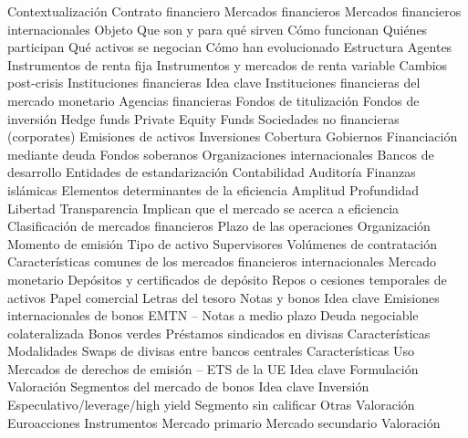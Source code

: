 \documentclass{nuevotema}
\begin{document}
\begin{esquema}[enumerate]
	\1[] 
		\2 Contextualización
			\3 Contrato financiero
			\3 Mercados financieros
			\3 Mercados financieros internacionales
		\2 Objeto
			\3 Que son y para qué sirven
			\3 Cómo funcionan
			\3 Quiénes participan
			\3 Qué activos se negocian
			\3 Cómo han evolucionado
		\2 Estructura
			\3 Agentes
			\3 Instrumentos de renta fija
			\3 Instrumentos y mercados de renta variable
			\3 Cambios post-crisis
	\1 
		\2 Instituciones financieras
			\3 Idea clave
			\3 Instituciones financieras del mercado monetario
			\3 Agencias financieras
			\3 Fondos de titulización
			\3 Fondos de inversión
			\3 Hedge funds
			\3 Private Equity Funds
		\2 Sociedades no financieras (corporates)
			\3 Emisiones de activos
			\3 Inversiones
			\3 Cobertura
		\2 Gobiernos
			\3 Financiación mediante deuda
			\3 Fondos soberanos
		\2 Organizaciones internacionales
			\3 Bancos de desarrollo
		\2 Entidades de estandarización
			\3 Contabilidad
			\3 Auditoría
			\3 Finanzas islámicas
	\1 
		\2 Elementos determinantes de la eficiencia
			\3 Amplitud
			\3 Profundidad
			\3 Libertad
			\3 Transparencia
			\3[$\then$] Implican que el mercado se acerca a eficiencia
		\2 Clasificación de mercados financieros
			\3 Plazo de las operaciones
			\3 Organización
			\3 Momento de emisión
			\3 Tipo de activo
			\3 Supervisores
			\3 Volúmenes de contratación
		\2 Características comunes de los mercados financieros internacionales
	\1 
		\2 Mercado monetario
			\3 Depósitos y certificados de depósito
			\3 Repos o cesiones temporales de activos
			\3 Papel comercial
			\3 Letras del tesoro
		\2 Notas y bonos
			\3 Idea clave
			\3 Emisiones internacionales de bonos
			\3 EMTN -- Notas a medio plazo
			\3 Deuda negociable colateralizada
			\3 Bonos verdes
		\2 Préstamos sindicados en divisas
			\3 Características
			\3 Modalidades
		\2 Swaps de divisas entre bancos centrales
			\3 Características
			\3 Uso
		\2 Mercados de derechos de emisión -- ETS de la UE
			\3 Idea clave
			\3 Formulación
			\3 Valoración
		\2 Segmentos del mercado de bonos
			\3 Idea clave
			\3 Inversión
			\3 Especulativo/leverage/high yield
			\3 Segmento sin calificar
			\3 Otras
			\3 Valoración
	\1 
		\2 Euroacciones
			\3 Instrumentos
			\3 Mercado primario
			\3 Mercado secundario
			\3 Valoración

\end{esquema}
\end{document}
